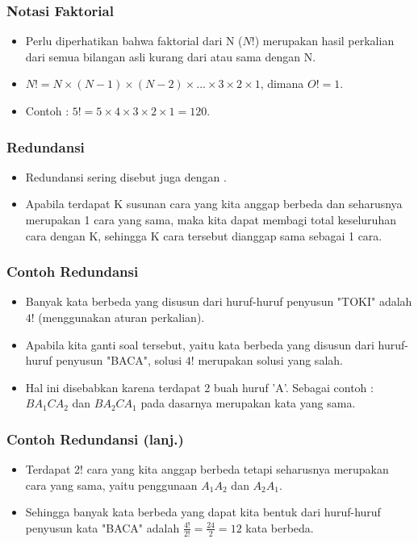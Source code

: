 \begin{frame}
\frametitle{Notasi Faktorial}
\begin{itemize}
  \item Perlu diperhatikan bahwa faktorial dari N ($N!$) merupakan hasil perkalian dari semua bilangan asli kurang dari atau sama dengan N.
  \item $N! = N \times (N-1) \times (N-2) \times ... \times 3 \times 2 \times 1$, dimana $O! = 1$.
  \item Contoh : $5! = 5 \times 4 \times 3 \times 2 \times 1 = 120$.
\end{itemize}
\end{frame}

\begin{frame}
\frametitle{Redundansi}
\begin{itemize}
  \item Redundansi sering disebut juga dengan .
  \item Apabila terdapat K susunan cara yang kita anggap berbeda dan seharusnya merupakan 1 cara yang sama, maka kita dapat membagi total keseluruhan cara dengan K, sehingga K cara tersebut dianggap sama sebagai 1 cara.
\end{itemize}
\end{frame}

\begin{frame}
\frametitle{Contoh Redundansi}
\begin{itemize}
  \item Banyak kata berbeda yang disusun dari huruf-huruf penyusun "TOKI" adalah $4!$ (menggunakan aturan perkalian).
  \item Apabila kita ganti soal tersebut, yaitu kata berbeda yang disusun dari huruf-huruf penyusun "BACA", solusi $4!$ merupakan solusi yang salah.
  \item Hal ini disebabkan karena terdapat 2 buah huruf 'A'. Sebagai contoh : $BA_{1}CA_{2}$ dan $BA_{2}CA_{1}$ pada dasarnya merupakan kata yang sama.
\end{itemize}
\end{frame}

\begin{frame}
\frametitle{Contoh Redundansi (lanj.)}
\begin{itemize}
  \item Terdapat 2! cara yang kita anggap berbeda tetapi seharusnya merupakan cara yang sama, yaitu penggunaan $A_{1}A_{2}$ dan $A_{2}A_{1}$.
  \item Sehingga banyak kata berbeda yang dapat kita bentuk dari huruf-huruf penyusun kata "BACA" adalah $\frac{4!}{2!} = \frac{24}{2} = 12$ kata berbeda.
\end{itemize}
\end{frame}

